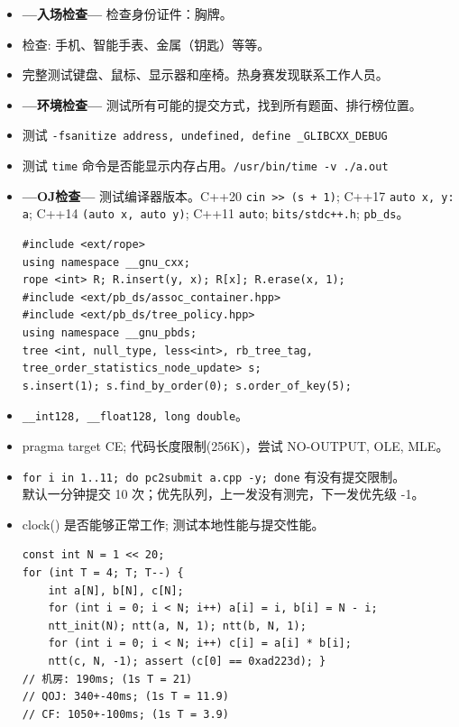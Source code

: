 \begin{small}
\begin{itemize}[leftmargin=0.5mm]
	\setlength{\itemsep}{0pt}
	\setlength{\parskip}{0.5pt}
	\item \textbf{\large ---入场检查---} 检查身份证件：胸牌。
	\item 检查: 手机、智能手表、金属（钥匙）等等。
	\item 完整测试键盘、鼠标、显示器和座椅。热身赛发现联系工作人员。
	\item \textbf{\large ---环境检查---} 测试所有可能的提交方式，找到所有题面、排行榜位置。
	\item 测试 \texttt{-fsanitize address, undefined, define \_GLIBCXX\_DEBUG}
	\item 测试 \texttt{time} 命令是否能显示内存占用。\texttt{/usr/bin/time -v ./a.out}
	\item \textbf{\large ---OJ检查---} 测试编译器版本。C++20 \texttt{cin >> (s + 1)}; C++17 \texttt{auto \lbrack x, y\rbrack : a}; C++14 \texttt{\lbrack \rbrack (auto x, auto y)}; C++11 \texttt{auto}; \texttt{bits/stdc++.h}; \texttt{pb\_ds}。
\begin{verbatim}
#include <ext/rope>
using namespace __gnu_cxx;
rope <int> R; R.insert(y, x); R[x]; R.erase(x, 1);
#include <ext/pb_ds/assoc_container.hpp> 
#include <ext/pb_ds/tree_policy.hpp> 
using namespace __gnu_pbds;
tree <int, null_type, less<int>, rb_tree_tag,
tree_order_statistics_node_update> s;
s.insert(1); s.find_by_order(0); s.order_of_key(5);
\end{verbatim}
	\item \texttt{\_\_int128, \_\_float128, long double}。
	\item pragma target CE; 代码长度限制(256K)，尝试 NO-OUTPUT, OLE, MLE。
	\item \texttt{for i in {1..11}; do pc2submit a.cpp -y; done} 有没有提交限制。\\默认一分钟提交 10 次；优先队列，上一发没有测完，下一发优先级 -1。
	\item clock() 是否能够正常工作; 测试本地性能与提交性能。
\begin{verbatim}
const int N = 1 << 20;
for (int T = 4; T; T--) {
    int a[N], b[N], c[N];
    for (int i = 0; i < N; i++) a[i] = i, b[i] = N - i;
    ntt_init(N); ntt(a, N, 1); ntt(b, N, 1);
    for (int i = 0; i < N; i++) c[i] = a[i] * b[i];
    ntt(c, N, -1); assert (c[0] == 0xad223d); }
// 机房: 190ms; (1s T = 21)
// QOJ: 340+-40ms; (1s T = 11.9)
// CF: 1050+-100ms; (1s T = 3.9)
\end{verbatim}

\end{itemize}
\end{small}
